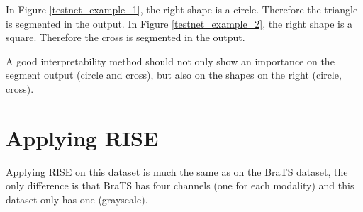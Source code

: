 In Figure \ref{testnet_example_1}, the right shape is a circle. Therefore the triangle is segmented in the output.
In Figure \ref{testnet_example_2}, the right shape is a square. Therefore the cross is segmented in the output.

A good interpretability method should not only show an importance on the segment output (circle and cross), but also on the shapes on the right (circle, cross).

\section{Applying RISE}

Applying RISE on this dataset is much the same as on the BraTS dataset, the only difference is that BraTS has four channels (one for each modality) and this dataset only has one (grayscale).

